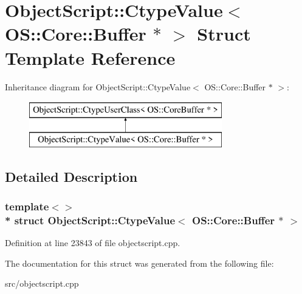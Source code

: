 \hypertarget{struct_object_script_1_1_ctype_value_3_01_o_s_1_1_core_1_1_buffer_01_5_01_4}{}\section{Object\+Script\+:\+:Ctype\+Value$<$ OS\+:\+:Core\+:\+:Buffer $\ast$ $>$ Struct Template Reference}
\label{struct_object_script_1_1_ctype_value_3_01_o_s_1_1_core_1_1_buffer_01_5_01_4}
Inheritance diagram for Object\+Script\+:\+:Ctype\+Value$<$ OS\+:\+:Core\+:\+:Buffer $\ast$ $>$\+:\begin{figure}[H]
\begin{center}
\leavevmode
\includegraphics[height=2.000000cm]{struct_object_script_1_1_ctype_value_3_01_o_s_1_1_core_1_1_buffer_01_5_01_4}
\end{center}
\end{figure}


\subsection{Detailed Description}
\subsubsection*{template$<$$>$\\*
struct Object\+Script\+::\+Ctype\+Value$<$ O\+S\+::\+Core\+::\+Buffer $\ast$ $>$}



Definition at line 23843 of file objectscript.\+cpp.



The documentation for this struct was generated from the following file\+:\begin{DoxyCompactItemize}
\item 
src/objectscript.\+cpp\end{DoxyCompactItemize}
